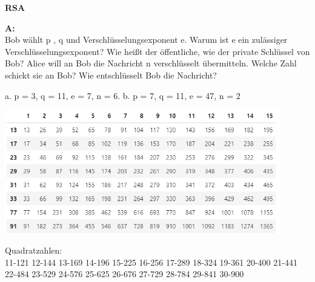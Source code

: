 \documentclass[landscape,twocolumn,a4paper]{article}
\begin{document}
\textbf{RSA} \bigskip

\textbf{A:}   \\
Bob wählt p , q  und Verschlüsselungsexponent e. Warum ist e ein
zulässiger Verschlüsselungsexponent? Wie heißt der öffentliche, wie der private Schlüssel von Bob?
Alice will an Bob die Nachricht n verschlüsselt übermitteln.  
Welche Zahl schickt sie an Bob? Wie entschlüsselt Bob die Nachricht?

a.  p = 3, q = 11,  e = 7, n = 6. \quad
b.  p = 7, q = 11, e = 47, n = 2 

\newpage

\includegraphics[width=12cm]{reihen.png}

Quadratzahlen: \\
11-121 12-144 13-169 14-196 15-225 16-256 17-289 18-324 19-361 20-400 
21-441 22-484 23-529 24-576 25-625 26-676 27-729 28-784 29-841 30-900 


\bigskip {}
\bigskip {}
\end{document}
